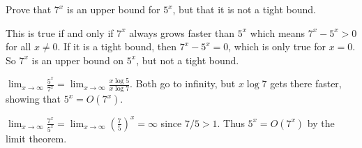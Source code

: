 \newpage

\begin{eval}
Prove that $7^x$ is an upper bound for $5^x$, but that it is not a tight bound.
\begin{spfenum}
\item
This is true if and only if $7^x$ always grows faster than $5^x$ 
which means $7^x-5^x>0$ for all $x\neq 0$.
If it is a tight bound, then $7^x-5^x=0$, which is only true for $x=0$.
So $7^x$ is an upper bound on $5^x$, but not a tight bound.

\noindent
\evallinetwo
\item 
${\displaystyle \lim_{x\rightarrow \infty}\frac{5^x}{7^x} = 
\lim_{x\rightarrow \infty}\frac{x\log 5}{x\log 7}.}$
Both go to infinity, but $x\log 7$ gets there faster, showing that $5^x=O(7^x)$.

\noindent
\evallinetwo
\item
${\displaystyle \lim_{x\rightarrow \infty}\frac{7^x}{5^x} = 
\lim_{x\rightarrow \infty}\left(\frac{7}{5}\right)^x=\infty}$
since $7/5>1$.  Thus $5^x=O(7^x)$ by the limit theorem.


\end{spfenum}
\end{eval}
